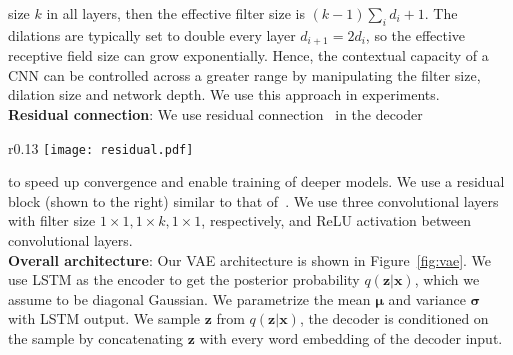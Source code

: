 \documentclass{article}
\begin{document}
size $k$ in all layers, then the effective filter size is $ (k-1)\sum_{i}d_{i} + 1$.
The dilations are typically set to double every layer $d_{i+1} = 2d_{i}$,
so the effective receptive field size can grow exponentially. Hence, the contextual capacity
of a CNN can be controlled across a greater range by manipulating the filter size, dilation size and network depth. We use this approach in experiments.
\\[0.2cm]
{\bf Residual connection}:
We use residual connection~\cite{he2016deep} in the decoder
\begin{wrapfigure}{r}{0.13\textwidth}
  \vspace{-0.5cm}
  \centering
  \texttt{[image: residual.pdf]}
  \label{fig:residual}
  \vspace{-0.4cm}
\end{wrapfigure}
to speed up
convergence and enable training of deeper models.
We use a residual block
(shown to the right)
similar to that
of~\cite{kalchbrenner2016neural}.
We use three convolutional layers with filter size $1\times1, 1\times k, 1\times 1$,
respectively, and ReLU activation
between convolutional layers.
\\[0.2cm]
{\bf Overall architecture}: Our VAE architecture is shown in Figure~\ref{fig:vae}.
We use LSTM as the encoder to get the posterior probability
$q(\mathbf{z}|\mathbf{x})$, which we assume to be
diagonal Gaussian. We parametrize the mean $\mathbf{\mu}$ and
variance $\mathbf{\sigma}$ with LSTM output. We sample $\mathbf{z}$ from
$q(\mathbf{z}|\mathbf{x})$, the decoder is conditioned on the sample by
concatenating $\mathbf{z}$ with every word embedding of the decoder input.
\end{document}
